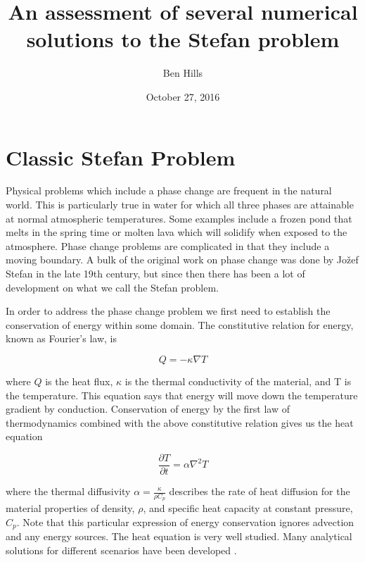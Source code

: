 \documentclass[12pt]{article}
\title{An assessment of several numerical solutions to the Stefan problem}
\author{Ben Hills}
\date{October 27, 2016}
\begin{document}
\maketitle

\raggedright

\section{Classic Stefan Problem}

Physical problems which include a phase change are frequent in the natural world. This is particularly true in water for which all three phases are attainable at normal atmospheric temperatures. Some examples include a frozen pond that melts in the spring time or molten lava which will solidify when exposed to the atmosphere.  Phase change problems are complicated in that they include a moving boundary. A bulk of the original work on phase change was done by Jo\v{z}ef Stefan in the late 19th century, but since then there has been a lot of development on what we call the Stefan problem.\par

In order to address the phase change problem we first need to establish the conservation of energy within some domain. The constitutive relation for energy, known as Fourier's law, is

\begin{equation}
Q = -\kappa \nabla T
\end{equation}

where $Q$ is the heat flux, $\kappa$ is the thermal conductivity of the material, and T is the temperature. This equation says that energy will move down the temperature gradient by conduction. Conservation of energy by the first law of thermodynamics combined with the above constitutive relation gives us the heat equation

\begin{equation}\label{eq:Heat}
\frac{\partial T}{\partial t} = \alpha \nabla^2 T
\end{equation}

where the thermal diffusivity $\alpha = \frac{\kappa}{\rho C_p}$ describes the rate of heat diffusion for the material properties of density, $\rho$, and specific heat capacity at constant pressure, $C_p$. Note that this particular expression of energy conservation ignores advection and any energy sources. The heat equation is very well studied. Many analytical solutions for different scenarios have been developed \citep{Carslaw1959}.
\end{document}
